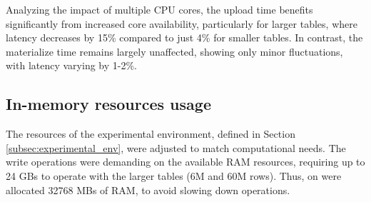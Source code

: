 Analyzing the impact of multiple \gls{CPU} cores, the upload time benefits significantly from increased core availability, particularly for larger tables, where latency decreases by 15\% compared to just 4\% for smaller tables. In contrast, the materialize time remains largely unaffected, showing only minor fluctuations, with latency varying by 1-2\%.



\subsection{In-memory resources usage}
\label{subsec:resources_usage}

The resources of the experimental environment, defined in Section \ref{subsec:experimental_env}, were adjusted to match computational needs. The write operations were demanding on the available \gls{RAM} resources, requiring up to 24 GBs to operate with the larger tables (6M and 60M rows). Thus, on were allocated 32768 MBs of \gls{RAM}, to avoid slowing down operations.